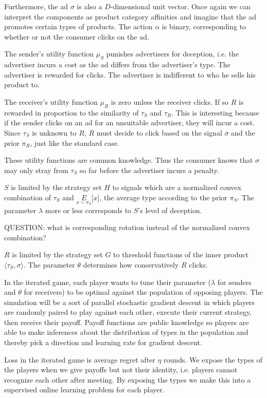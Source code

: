 \documentclass{article}
\begin{document}
Furthermore, the ad $\sigma$ is also a $D$-dimensional unit vector. Once again we can interpret the components as product category affinities and imagine that the ad promotes certain types of products. The action $\alpha$ is binary, corresponding to whether or not the consumer clicks on the ad.

The sender's utility function $\mu_S$ punishes advertisers for deception, i.e. the advertiser incurs a cost as the ad differs from the advertiser's type. The advertiser is rewarded for clicks. The advertiser is indifferent to who he sells his product to.

The receiver's utility function $\mu_R$ is zero unless the receiver clicks. If so $R$ is rewarded in proportion to the similarity of $\tau_S$ and $\tau_R$. This is interesting because if the sender clicks on an ad for an unsuitable advertiser, they will incur a cost. Since $\tau_S$ is unknown to $R$, $R$ must decide to click based on the signal $\sigma$ and the prior $\pi_R$, just like the standard case.

These utility functions are common knowledge. Thus the consumer knows that $\sigma$ may only stray from $\tau_S$ so far before the advertiser incurs a penalty.

$S$ is limited by the strategy set $H$ to signals which are a normalized convex combination of $\tau_S$ and $\underset{x\sim\pi_S}{E}\lbrack x \rbrack$, the average type according to the prior $\pi_S$. The parameter $\lambda$ more or less corresponds to $S$'s level of deception.

QUESTION: what is corresponding rotation instead of the normalized convex combination?

$R$ is limited by the strategy set $G$ to threshold functions of the inner product $\langle \tau_S, \sigma \rangle$. The parameter $\theta$ determines how conservatively $R$ clicks.

In the iterated game, each player wants to tune their parameter ($\lambda$ for senders and $\theta$ for receivers) to be optimal against the population of opposing players. The simulation will be a sort of parallel stochastic gradient descent in which players are randomly paired to play against each other, execute their current strategy, then receive their payoff. Payoff functions are public knowledge so players are able to make inferences about the distribution of types in the population and thereby pick a direction and learning rate for gradient descent.

Loss in the iterated game is average regret after $\eta$ rounds. We expose the types of the players when we give payoffs but not their identity, i.e. players cannot recognize each other after meeting. By exposing the types we make this into a supervised online learning problem for each player.
\end{document}
